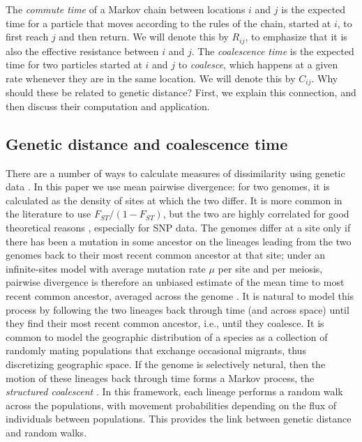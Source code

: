 \documentclass{article}
\begin{document}
The \emph{commute time} of a Markov chain between locations $i$ and $j$
is the expected time for a particle that moves according to the rules of the chain, 
started at $i$, to first reach $j$ and then return.
We will denote this by $R_{ij}$, to emphasize that it is also the effective resistance
between $i$ and $j$.
The \emph{coalescence time} is the expected time for two particles started at $i$ and $j$
to \emph{coalesce},
which happens at a given rate whenever they are in the same location.
We will denote this by $C_{ij}$.
Why should these be related to genetic distance? 
First, we explain this connection,
and then discuss their computation and application.


\subsection*{Genetic distance and coalescence time}

There are a number of ways to calculate measures of dissimilarity using genetic data \citep{distances}.
In this paper we use mean pairwise divergence:
for two genomes, it is calculated as the density of sites at which the two differ.
It is more common in the literature to use $F_{ST}/(1-F_{ST})$,
but the two are highly correlated for good theoretical reasons \citet{slatkin_fst,rousset1997genetic},
especially for SNP data.
The genomes differ at a site only if there has been a mutation in some ancestor on the lineages leading
from the two genomes back to their most recent common ancestor at that site;
under an infinite-sites model with average mutation rate $\mu$ per site and per meiosis,
pairwise divergence is therefore an unbiased estimate of the mean time to most recent common ancestor,
averaged across the genome \citep{hudson2007variance,ralphXX}.
It is natural to model this process by following the two lineages back through time
(and across space)
until they find their most recent common ancestor,
i.e., until they coalesce.
It is common to model the geographic distribution of a species
as a collection of randomly mating populations
that exchange occasional migrants,
thus discretizing geographic space.
If the genome is selectively netural,
then the motion of these lineages back through time
forms a Markov process, the \emph{structured coalescent} \citep{wakeley2005coalescent}.
In this framework, each lineage performs a random walk across the populations,
with movement probabilities depending on the flux of individuals between populations.
This provides the link between genetic distance and random walks.
\end{document}
